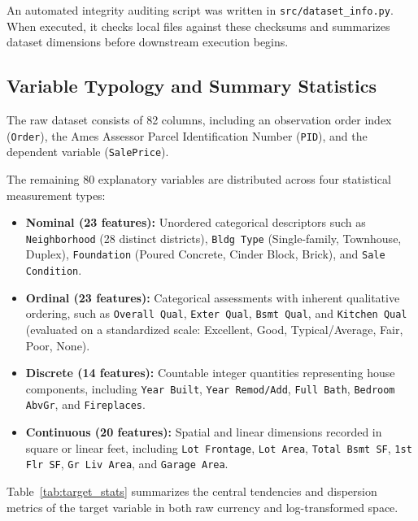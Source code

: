 \documentclass[11pt,a4paper]{article}
\begin{document}
An automated integrity auditing script was written in \texttt{src/dataset\_info.py}. When executed, it checks local files against these checksums and summarizes dataset dimensions before downstream execution begins.

\subsection{Variable Typology and Summary Statistics}
The raw dataset consists of 82 columns, including an observation order index (\texttt{Order}), the Ames Assessor Parcel Identification Number (\texttt{PID}), and the dependent variable (\texttt{SalePrice}). 

The remaining 80 explanatory variables are distributed across four statistical measurement types:
\begin{itemize}
    \item \textbf{Nominal (23 features):} Unordered categorical descriptors such as \texttt{Neighborhood} (28 distinct districts), \texttt{Bldg Type} (Single-family, Townhouse, Duplex), \texttt{Foundation} (Poured Concrete, Cinder Block, Brick), and \texttt{Sale Condition}.
    \item \textbf{Ordinal (23 features):} Categorical assessments with inherent qualitative ordering, such as \texttt{Overall Qual}, \texttt{Exter Qual}, \texttt{Bsmt Qual}, and \texttt{Kitchen Qual} (evaluated on a standardized scale: Excellent, Good, Typical/Average, Fair, Poor, None).
    \item \textbf{Discrete (14 features):} Countable integer quantities representing house components, including \texttt{Year Built}, \texttt{Year Remod/Add}, \texttt{Full Bath}, \texttt{Bedroom AbvGr}, and \texttt{Fireplaces}.
    \item \textbf{Continuous (20 features):} Spatial and linear dimensions recorded in square or linear feet, including \texttt{Lot Frontage}, \texttt{Lot Area}, \texttt{Total Bsmt SF}, \texttt{1st Flr SF}, \texttt{Gr Liv Area}, and \texttt{Garage Area}.
\end{itemize}

Table~\ref{tab:target_stats} summarizes the central tendencies and dispersion metrics of the target variable in both raw currency and log-transformed space.
\end{document}
